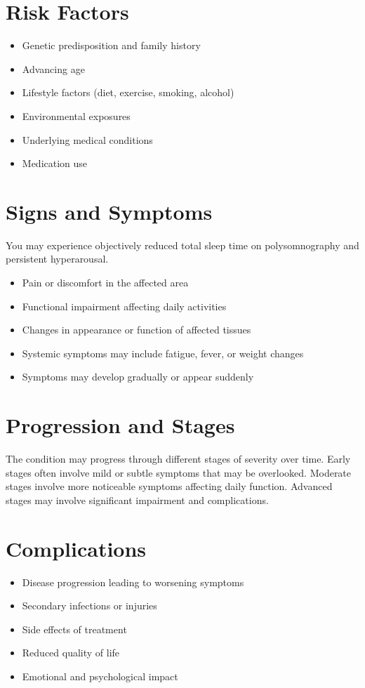 \section{Risk Factors}
\begin{itemize}[noitemsep]
  \item Genetic predisposition and family history
  \item Advancing age
  \item Lifestyle factors (diet, exercise, smoking, alcohol)
  \item Environmental exposures
  \item Underlying medical conditions
  \item Medication use
\end{itemize}
\section{Signs and Symptoms}
You may experience objectively reduced total sleep time on polysomnography and persistent hyperarousal.

\begin{itemize}[noitemsep]
  \item Pain or discomfort in the affected area
  \item Functional impairment affecting daily activities
  \item Changes in appearance or function of affected tissues
  \item Systemic symptoms may include fatigue, fever, or weight changes
  \item Symptoms may develop gradually or appear suddenly
\end{itemize}
\section{Progression and Stages}
The condition may progress through different stages of severity over time. Early stages often involve mild or subtle symptoms that may be overlooked. Moderate stages involve more noticeable symptoms affecting daily function. Advanced stages may involve significant impairment and complications.
\section{Complications}
\begin{itemize}[noitemsep]
  \item Disease progression leading to worsening symptoms
  \item Secondary infections or injuries
  \item Side effects of treatment
  \item Reduced quality of life
  \item Emotional and psychological impact
\end{itemize}

